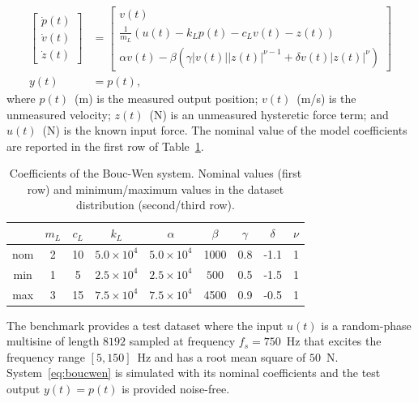 \documentclass{article}
\begin{document}
\begin{subequations}  
\label{eq:boucwen}
\begin{align}
\begin{bmatrix} 
\dot{p}(t) \\ 
\dot{v}(t) \\ 
\dot{z}(t) 
\end{bmatrix}
&=
\begin{bmatrix} 
v(t) \\ 
\frac{1}{m_L} \left (u(t) -k_L p(t) - c_L v(t) - z(t)  \right) \\ 
\alpha v(t) - \beta(\gamma |v(t)| |z(t)|^{\nu -1} + \delta v(t) |z(t)|^\nu)
\end{bmatrix}\\
y(t) &= p(t),
\end{align}
\end{subequations}
where $p(t)$~(m) is the measured output position; $v(t)$~(m/s) is the unmeasured velocity; $z(t)$~(N) is an unmeasured hysteretic force term; and $u(t)$~(N) is the known input force. The nominal value of the model coefficients are reported in the first row of Table~\ref{tab:bw_params}.
\begin{table}[!ht]
\setlength{\tabcolsep}{4pt}
\centering
\caption{Coefficients of the Bouc-Wen system. Nominal values (first row) and minimum/maximum values in the dataset distribution (second/third row).}
\label{tab:bw_params}
\small
\begin{tabular}{c||cccccccc}
\toprule
 & $m_L$ & $c_L$ & $k_L$ & $\alpha$ & $\beta$ & $\gamma$ & $\delta$ &$\nu$\\
\midrule
nom & 2 & 10 &$5.0\times 10^4$ & $5.0\times 10^4$ & 1000 & 0.8 & -1.1 & 1\\
min & 1 & 5 & $2.5\times 10^4$ & $2.5\times 10^4$ & $500$ & 0.5 & -1.5 &1\\
max & 3 & 15 & $7.5\times 10^4$ & $7.5\times 10^4$ & 4500 & 0.9 & -0.5 &1\\
\bottomrule
\end{tabular} 
\end{table}

The benchmark provides a test dataset where the input $u(t)$ is a random-phase multisine of length $8192$ sampled at frequency $f_s=750$~Hz  that excites the frequency range $[5, 150]$~Hz and has a root mean square of $50$~N. System~\eqref{eq:boucwen} is simulated with 
its nominal coefficients and the test output $y(t) = p(t)$ is provided noise-free.
\end{document}
